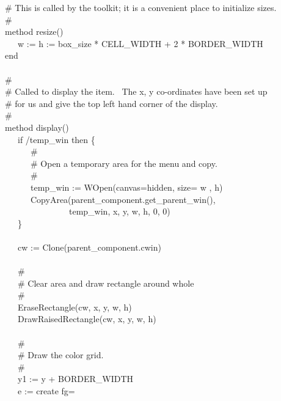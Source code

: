 {\>   \# This is called by the toolkit; it is a convenient place to initialize sizes. \\
\>   \# \\
\>   method resize() \\
\>   \ \ \ w := h := box\_size * CELL\_WIDTH + 2 * BORDER\_WIDTH \\
\>   end \\
\ \\
\>   \# \\
\>   \# Called to display the item. \ The x, y co-ordinates have been set up \\
\>   \# for us and give the top left hand corner of the display.  \\
\>   \# \\
\>   method display() \\
\>   \ \ \ if /temp\_win then \{ \\
\>   \ \ \ \ \ \ \# \\
\>   \ \ \ \ \ \ \# Open a temporary area for the menu and copy. \\
\>   \ \ \ \ \ \ \# \\
\>   \ \ \ \ \ \ temp\_win :=
WOpen({\textquotedbl}canvas=hidden{\textquotedbl},
{\textquotedbl}size={\textquotedbl} {\textbar}{\textbar} w
{\textbar}{\textbar} {\textquotedbl},{\textquotedbl}
{\textbar}{\textbar} h) \\
\>   \ \ \ \ \ \ CopyArea(parent\_component.get\_parent\_win(), \\
\>   \ \ \ \ \ \ \ \ \ \ \ \ \ \ \ temp\_win, x, y,
w, h, 0, 0) \\
\>   \ \ \ \} \\
\ \\
\>   \ \ \ cw := Clone(parent\_component.cwin) \\
\ \\
\>   \ \ \ \# \\
\>   \ \ \ \# Clear area and draw rectangle around whole \\
\>   \ \ \ \# \\
\>   \ \ \ EraseRectangle(cw, x, y, w, h) \\
\>   \ \ \ DrawRaisedRectangle(cw, x, y, w, h) \\
\ \\
\>   \ \ \ \# \\
\>   \ \ \ \# Draw the color grid. \\
\>   \ \ \ \# \\
\>   \ \ \ y1 := y + BORDER\_WIDTH \ \ \ \ \  \\
\>   \ \ \ e := create {\textquotedbl}fg={\textquotedbl}
}
